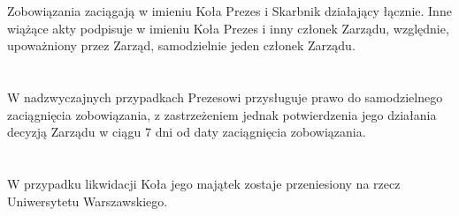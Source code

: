 \documentclass[a4paper]{article}
\begin{document}
\section{}
Zobowiązania zaciągają w imieniu Koła Prezes i Skarbnik działający łącznie. Inne wiążące akty podpisuje w imieniu Koła Prezes i inny członek Zarządu, względnie, upoważniony przez Zarząd, samodzielnie jeden członek Zarządu.
 
\section{}
W nadzwyczajnych przypadkach Prezesowi przysługuje prawo do samodzielnego zaciągnięcia zobowiązania, z zastrzeżeniem jednak potwierdzenia jego działania decyzją Zarządu w ciągu 7 dni od daty zaciągnięcia zobowiązania.
 
\section{}
W przypadku likwidacji Koła jego majątek zostaje przeniesiony na rzecz Uniwersytetu Warszawskiego.
\end{document}
